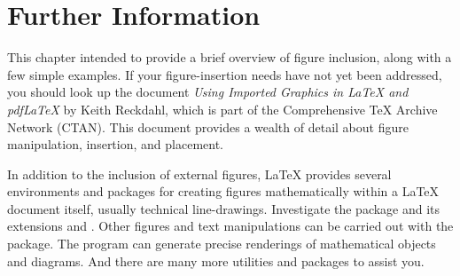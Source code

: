 \section{Further Information}
This chapter intended to provide a brief overview of figure inclusion,
along with a few simple examples.  If your figure-insertion needs have
not yet been addressed, you should look up the document \textit{Using
  Imported Graphics in \LaTeX{} and pdf\LaTeX} by Keith Reckdahl,
which is part of the Comprehensive \TeX{} Archive Network (CTAN).
This document provides a wealth of detail about figure manipulation,
insertion, and placement.

In addition to the inclusion of external figures, \LaTeX{} provides
several environments and packages for creating figures mathematically
within a \LaTeX{} document itself, usually technical line-drawings.
Investigate the  package and its extensions 
and .  Other figures and text manipulations can be carried
out with the  package.  The program \MP{} can generate
precise renderings of mathematical objects and diagrams.  And there
are many more utilities and packages to assist you.

